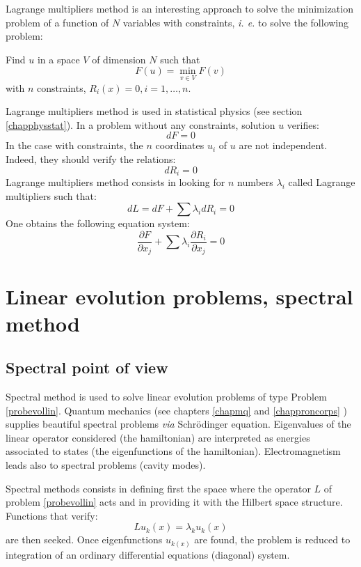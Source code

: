 \documentclass[12pt]{book}
\begin{document}
Lagrange multipliers method is an interesting approach to solve the
minimization problem of a function of $N$ variables with constraints, {\it
  i. e. } to solve the following problem:
\begin{prob}
Find  $u$ in a space $V$ of dimension $N$ such that 
\begin{equation} 
F(u)=\min_{v\in V}F(v)
\end{equation}
with $n$ constraints, $R_i(x)=0, i=1,\dots,n.$
\end{prob}
Lagrange multipliers method is used in statistical physics (see section
\ref{chapphysstat}).
In a problem without any constraints, solution $u$ verifies:
\begin{equation}
dF=0
\end{equation}
In the case with constraints, the $n$ coordinates
$u_i$ of $u$ are not independent. Indeed, they should verify the relations:
\begin{equation}
dR_i=0
\end{equation}
Lagrange multipliers method consists in looking for $n$ numbers $\lambda_i$
called Lagrange multipliers such that:
\begin{equation}
dL=dF+\sum \lambda_i dR_i=0
\end{equation}
One obtains the following equation system:
\begin{equation}
\frac{\partial F}{\partial x_j}+\sum \lambda_i \frac{\partial R_i}{\partial x_j}=0
\end{equation}
\section{Linear evolution problems, spectral method}\label{chapmethspec}
\subsection{Spectral point of view}
Spectral method is used to solve linear evolution problems of type Problem
\ref{probevollin}. Quantum mechanics (see chapters \ref{chapmq} and
\ref{chapproncorps} ) supplies beautiful spectral problems
{\it via} Schr\"odinger equation.
Eigenvalues of the linear operator considered (the hamiltonian) are
interpreted as energies associated to states (the eigenfunctions of the
hamiltonian). Electromagnetism leads also to spectral problems (cavity
modes). 

Spectral methods consists in defining first the space where the operator $L$
of problem \ref{probevollin} acts
and in providing it with the Hilbert space structure. Functions that verify:
\begin{equation}
Lu_k(x)=\lambda_ku_k(x)
\end{equation}
are then seeked. Once eigenfunctions $u_{k(x)}$ are found,
the problem is reduced to integration of an ordinary differential equations
(diagonal) system.
\end{document}
